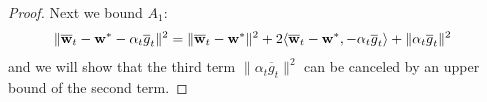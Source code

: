 \begin{proof}
	Next we bound $A_{1}$: 
	\begin{align*}
	\|{\overline{\mathbf{w}}}_{t}-{\mathbf{w}}^{\ast}-\alpha_{t}\overline{g}_{t}\|^{2} & =\|{\overline{\mathbf{w}}}_{t}-{\mathbf{w}}^{\ast}\|^{2}+2\langle{\overline{\mathbf{w}}}_{t}-{\mathbf{w}}^{\ast},-\alpha_{t}\overline{g}_{t}\rangle+\|\alpha_{t}\overline{g}_{t}\|^{2}
	\end{align*}
	and we will show that the third term $\|\alpha_{t}\overline{g}_{t}\|^{2}$
	can be canceled by an upper bound of the second term. %
	\begin{comment}
	The last term is straightforward to bound by the convexity of $\|\cdot\|^{2}$
	and $L$-smoothness of $F_{k}$,
	\begin{align*}
	\alpha_{t}^{2}\|\overline{g}_{t}\|^{2} & \leq\alpha_{t}^{2}\sum_{k=1}^{N}p_{k}\|\nabla F_{k}(\vw_{t}^{k})\|^{2}\leq2L\alpha_{t}^{2}\sum_{k=1}^{N}p_{k}(F_{k}(\vw_{t}^{k})-F_{k}^{\ast})
	\end{align*}
	or 
	\begin{align*}
	\alpha_{t}^{2}\|\overline{g}_{t}\|^{2} & \leq\alpha_{t}^{2}\sum_{k=1}^{N}p_{k}\|\nabla F_{k}(\vw_{t}^{k})\|^{2}\leq\alpha_{t}^{2}\sum_{k=1}^{N}p_{k}\mathbb{E}\|\nabla F_{k}(\vw_{t}^{k},\xi_{t}^{k})\|^{2}\leq\alpha_{t}^{2}G^{2}
	\end{align*}
	\end{comment}
	

\end{proof}
